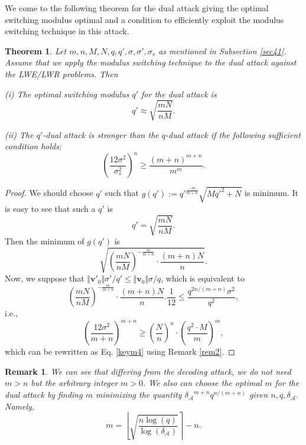 \documentclass{cta-author}
\newtheorem{theorem}{Theorem}{}
\newtheorem{remark}{Remark}{}
\begin{document}
We come to the following theorem for the dual attack giving the optimal switching modulus optimal  and a condition to efficiently exploit the modulus switching technique in this attack.
\begin{theorem} \label{theorem4} Let $m, n, M, N, q, q', \sigma, \sigma', \sigma_s$ as mentioned in Subsection \ref{sec41}. Assume that we apply the modulus switching technique to the dual attack against the LWE/LWR problems. Then
	
	(i) The optimal switching modulus $q'$ for the dual attack is
	\begin{equation} \label{eqmm}
	q'\approx \sqrt{\frac{mN}{nM}}.
	\end{equation}
	
	(ii) The $q'$-dual attack is stronger than the $q$-dual attack if the following sufficient condition holds:
		\begin{equation}\label{keym4}
	\left(\frac{12\sigma^2}{\sigma_s^2}\right)^{n} \geq\frac{(m+n)^{m+n}}{m^{m}}.
\end{equation}
\end{theorem}
\begin{proof}
We should choose  $q'$ such that $g(q'):={q'}^{\frac{-m}{m+n}}\sqrt{M{q'}^2+N}$ is minimum. It is easy to see that such a $q'$ is $$q'=\sqrt{\frac{mN}{nM}}.$$ Then the minimum of $g(q')$ is $$\sqrt{\left(\frac{mN}{nM}\right)^{-\frac{m}{m+n}} \cdot \frac{(m+n)N}{n}}.$$
Now, we suppose that $\Vert \mathbf{v'}_{0}\Vert\sigma'/q' \leq \Vert \mathbf{v}_{0}\Vert\sigma/q$, which is equivalent to
$$ \left(\frac{mN}{nM}\right)^{-\frac{m}{m+n}} \cdot \frac{(m+n)N}{n}.\frac{1}{12} \leq \frac{q^{2n/(m+n)}{\sigma^2}}{q^2},$$
i.e.,
\begin{equation*}\label{eqwm}
\left(\frac{12\sigma^2}{m+n}\right)^{m+n} \geq \left( \frac{N}{n}\right)^{n} \cdot \left(\frac{ q^{2} \cdot M}{m} \right)^m,
\end{equation*}
which can be rewritten as
Eq. \eqref{keym4} using Remark \ref{rem2}.

\end{proof}


\begin{remark}
We can see that differing from the decoding attack, we do not need $m>n$ but the arbitrary integer $m>0$. We also can choose the optimal $m$ for the dual attack by finding $m$ minimizing the quantity ${\delta_{\mathcal{A}}}^{m+n}q^{n/(m+n)}$ given $n, q, \delta_{\mathcal{A}}$. Namely, 
\begin{equation}\label{eqtt} 
m=\left \lfloor \sqrt{\frac{n\log (q)}{\log (\delta_{\mathcal{A}})}} \right\rceil-n.
\end{equation}

\end{remark}
\end{document}
